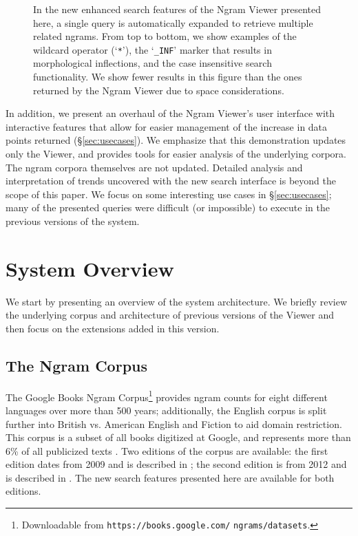 \documentclass[11pt,a4paper]{article}
\newcommand{\eat}[1]{\ignorespaces}
\newcommand{\query}[1]{\texttt{#1}}
\begin{document}
\begin{figure}[!t]
\begin{subfigure}
\end{subfigure}
\caption{In the new enhanced search features of the Ngram Viewer presented here, a single query is automatically expanded to retrieve multiple related ngrams. From top to bottom, we show examples of the wildcard operator (`\query{*}'), the `\query{\_INF}' marker that results in morphological inflections, and the case insensitive search functionality. \label{fig:examples} We show fewer results in this figure than the ones returned by the Ngram Viewer due to space considerations.
\vspace{-1.5em}}
\vspace{-1em}
\end{figure}

In addition, we present an overhaul of the Ngram Viewer's user interface with interactive features that allow for easier management of the increase in data points returned (\S\ref{sec:usecases}). \eat{For example, to normalize for morphological inflections or casing, the frequencies of multiple ngrams can be aggregated via a (right) mouse-click. Additionally, lines can be highlighted or faded (via hovering or mouse-clicks) to focus on particular ngrams and make trends more apparent.} We emphasize that this demonstration updates only the Viewer, and provides tools for easier analysis of the underlying corpora. The ngram corpora themselves are not updated.
Detailed analysis and interpretation of trends uncovered with the new search interface is beyond the scope of this paper. We focus on some interesting use cases in \S\ref{sec:usecases}; many of the presented queries were difficult (or impossible) to execute in the previous versions of the system.

\section{System Overview}
\label{sec:overview}

We start by presenting an overview of the system architecture. We briefly review the underlying corpus and architecture of previous versions of the Viewer \cite{culturomics,lin2012syntactic} and then focus on the extensions added in this version.


\subsection{The Ngram Corpus}
	The Google Books Ngram Corpus\footnote{Downloadable from \texttt{https://books.google.com/} \texttt{ngrams/datasets}.} provides ngram counts for eight different languages over more than 500 years; additionally, the English corpus is split further into British vs. American English and Fiction to aid domain restriction. This corpus is a subset of all books digitized at Google, and represents more than 6\% of all publicized texts \cite{lin2012syntactic}. Two editions of the corpus are available: the first edition dates from 2009 and is described in ; the second edition is from 2012 and is described in . The new search features presented here are available for both editions.
\end{document}
